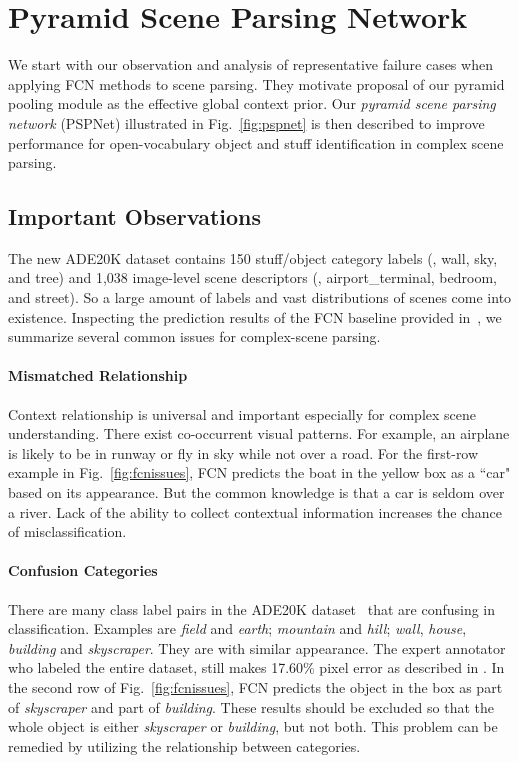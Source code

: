 \documentclass[10pt,twocolumn,letterpaper]{article}
\begin{document}
\section{Pyramid Scene Parsing Network}

We start with our observation and analysis of representative failure cases when applying
FCN methods to scene parsing. They motivate proposal of our pyramid pooling module as the
effective global context prior. Our {\it pyramid scene parsing network} (PSPNet)
illustrated in Fig.~\ref{fig:pspnet} is then described to improve performance for
open-vocabulary object and stuff identification in complex scene parsing.

\subsection{Important Observations}

The new ADE20K dataset \cite{zhou2016semantic} contains 150 stuff/object category labels
(\eg, wall, sky, and tree) and 1,038 image-level scene descriptors (\eg,
airport\_terminal, bedroom, and street). So a large amount of labels and vast
distributions of scenes come into existence. Inspecting the prediction results of the FCN
baseline provided in~\cite{zhou2016semantic}, we summarize several common issues for
complex-scene parsing.

\vspace{-0.1in}
\paragraph{Mismatched Relationship} Context relationship is universal and
important especially for complex scene understanding. There exist co-occurrent visual
patterns. For example, an airplane is likely to be in runway or fly in sky while not over
a road. For the first-row example in Fig.~\ref{fig:fcnissues}, FCN predicts the boat in
the yellow box as a ``car" based on its appearance. But the common knowledge is that a
car is seldom over a river. Lack of the ability to collect contextual information
increases the chance of misclassification.

\vspace{-0.1in}
\paragraph{Confusion Categories}
There are many class label pairs in the ADE20K dataset~\cite{zhou2016semantic} that are
confusing in classification. Examples are {\it field} and {\it earth}; {\it mountain} and
{\it hill}; {\it wall}, {\it house}, {\it building} and {\it skyscraper}. They are with
similar appearance. The expert annotator who labeled the entire dataset, still makes
17.60\% pixel error as described in \cite{zhou2016semantic}. In the second row of
Fig.~\ref{fig:fcnissues}, FCN predicts the object in the box as part of {\it skyscraper}
and part of {\it building}. These results should be excluded so that the whole object is
either {\it skyscraper} or {\it building}, but not both. This problem can be remedied by
utilizing the relationship between categories.
\end{document}
